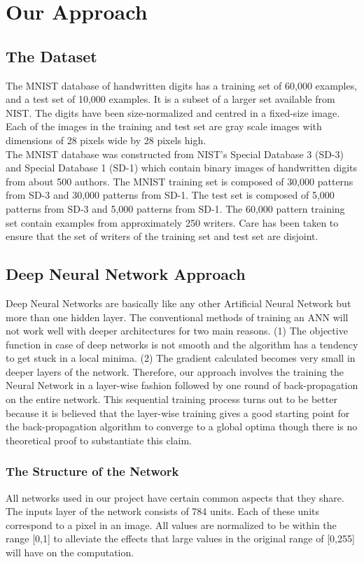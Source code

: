 \documentclass[10pt,twocolumn,letterpaper]{article}
\begin{document}
\section{Our Approach}
\subsection{The Dataset}
The MNIST database of handwritten digits has a training set of 60,000 examples, and a test set of 10,000 examples. It is a subset of a larger set available from NIST. The digits have been size-normalized and centred in a fixed-size image. Each of the images in the training and test set are gray scale images with dimensions of 28 pixels wide by 28 pixels high.\\

The MNIST database was constructed from NIST's Special Database 3 (SD-3) and Special Database 1 (SD-1) which contain binary images of handwritten digits from about 500 authors. The MNIST training set is composed of 30,000 patterns from SD-3 and 30,000 patterns from SD-1. The test set is composed of 5,000 patterns from SD-3 and 5,000 patterns from SD-1. The 60,000 pattern training set contain examples from approximately 250 writers. Care has been taken to ensure that the set of writers of the training set and test set are disjoint.

\subsection{Deep Neural Network Approach}
Deep Neural Networks are basically like any other Artificial Neural Network but more than one hidden layer. The conventional methods of training an ANN will not work well with deeper architectures for two main reasons. (1) The objective function in case of deep networks is not smooth and the algorithm has a tendency to get stuck in a local minima. (2) The gradient calculated becomes very small in deeper layers of the network. Therefore, our approach involves the training the Neural Network in a layer-wise fashion followed by one round of back-propagation on the entire network. This sequential training process turns out to be better because it is believed that the layer-wise training gives a good starting point for the back-propagation algorithm to converge to a global optima though there is no theoretical proof to substantiate this claim.

\subsubsection{The Structure of the Network}
All networks used in our project have certain common aspects that they share. The inputs layer of the network consists of 784 units. Each of these units correspond to a pixel in an image. All values are normalized to be within the range [0,1] to alleviate the effects that large values in the original range of [0,255] will have on the computation.\\
\end{document}
